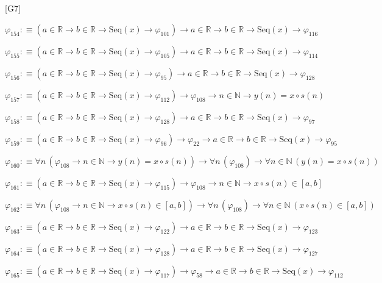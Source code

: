 \begin{fullproof}{[G7]}
\begin{abbrevlist}
\item $\varphi_{154} :\equiv (a \in \mathbb{R} \to b \in \mathbb{R} \to \mathrm{Seq}(x) \to \varphi_{101}) \to a \in \mathbb{R} \to b \in \mathbb{R} \to \mathrm{Seq}(x) \to \varphi_{116}$
\item $\varphi_{155} :\equiv (a \in \mathbb{R} \to b \in \mathbb{R} \to \mathrm{Seq}(x) \to \varphi_{105}) \to a \in \mathbb{R} \to b \in \mathbb{R} \to \mathrm{Seq}(x) \to \varphi_{114}$
\item $\varphi_{156} :\equiv (a \in \mathbb{R} \to b \in \mathbb{R} \to \mathrm{Seq}(x) \to \varphi_{95}) \to a \in \mathbb{R} \to b \in \mathbb{R} \to \mathrm{Seq}(x) \to \varphi_{128}$
\item $\varphi_{157} :\equiv (a \in \mathbb{R} \to b \in \mathbb{R} \to \mathrm{Seq}(x) \to \varphi_{112}) \to \varphi_{108} \to n \in \mathbb{N} \to y(n) = x \circ s(n)$
\item $\varphi_{158} :\equiv (a \in \mathbb{R} \to b \in \mathbb{R} \to \mathrm{Seq}(x) \to \varphi_{128}) \to a \in \mathbb{R} \to b \in \mathbb{R} \to \mathrm{Seq}(x) \to \varphi_{97}$
\item $\varphi_{159} :\equiv (a \in \mathbb{R} \to b \in \mathbb{R} \to \mathrm{Seq}(x) \to \varphi_{96}) \to \varphi_{22} \to a \in \mathbb{R} \to b \in \mathbb{R} \to \mathrm{Seq}(x) \to \varphi_{95}$
\item $\varphi_{160} :\equiv \forall n\,(\varphi_{108} \to n \in \mathbb{N} \to y(n) = x \circ s(n)) \to \forall n\,(\varphi_{108}) \to \forall n \in \mathbb{N}\,(y(n) = x \circ s(n))$
\item $\varphi_{161} :\equiv (a \in \mathbb{R} \to b \in \mathbb{R} \to \mathrm{Seq}(x) \to \varphi_{115}) \to \varphi_{108} \to n \in \mathbb{N} \to x \circ s(n) \in [a,b]$
\item $\varphi_{162} :\equiv \forall n\,(\varphi_{108} \to n \in \mathbb{N} \to x \circ s(n) \in [a,b]) \to \forall n\,(\varphi_{108}) \to \forall n \in \mathbb{N}\,(x \circ s(n) \in [a,b])$
\item $\varphi_{163} :\equiv (a \in \mathbb{R} \to b \in \mathbb{R} \to \mathrm{Seq}(x) \to \varphi_{122}) \to a \in \mathbb{R} \to b \in \mathbb{R} \to \mathrm{Seq}(x) \to \varphi_{123}$
\item $\varphi_{164} :\equiv (a \in \mathbb{R} \to b \in \mathbb{R} \to \mathrm{Seq}(x) \to \varphi_{128}) \to a \in \mathbb{R} \to b \in \mathbb{R} \to \mathrm{Seq}(x) \to \varphi_{127}$
\item $\varphi_{165} :\equiv (a \in \mathbb{R} \to b \in \mathbb{R} \to \mathrm{Seq}(x) \to \varphi_{117}) \to \varphi_{58} \to a \in \mathbb{R} \to b \in \mathbb{R} \to \mathrm{Seq}(x) \to \varphi_{112}$

\end{abbrevlist}
\end{fullproof}
